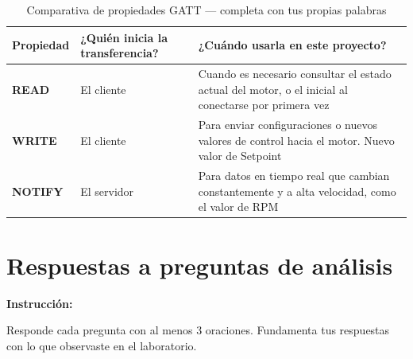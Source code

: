 \documentclass[12pt, letterpaper]{article}
\newenvironment{instruccion}{%
  \begin{mdframed}[
    backgroundcolor = tealLight,
    linecolor       = tealMain,
    linewidth       = 1pt,
    innerleftmargin = 10pt, innerrightmargin = 10pt,
    innertopmargin  = 6pt,  innerbottommargin= 6pt
  ]
  \small\color{tealMain}\textbf{Instrucción:}\hspace{4pt}\color{black}
}{%
  \end{mdframed}
}
\begin{document}
\begin{table}[H]
  \centering
  \caption{Comparativa de propiedades GATT — completa con tus propias palabras}
  \begin{tabular}{>{\bfseries}p{2cm} p{4.5cm} p{4.5cm}}
    \toprule
    \textbf{Propiedad} &
    \textbf{¿Quién inicia la transferencia?} &
    \textbf{¿Cuándo usarla en este proyecto?} \\
    \midrule
    READ    & El cliente & Cuando es necesario consultar el estado actual del motor, o el inicial al conectarse por primera vez \\[2.5em]
    WRITE   & El cliente & Para enviar configuraciones o nuevos valores de control hacia el motor. Nuevo valor de Setpoint \\[2.5em]
    NOTIFY  & El servidor & Para datos en tiempo real que cambian constantemente y a alta velocidad, como el valor de RPM \\[2.5em]
    \bottomrule
  \end{tabular}
\end{table}

\section{Respuestas a preguntas de análisis}

\begin{instruccion}
  Responde cada pregunta con al menos 3 oraciones. Fundamenta tus respuestas
  con lo que observaste en el laboratorio.
\end{instruccion}
\end{document}
